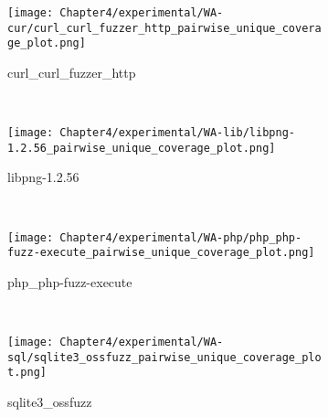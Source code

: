 \begin{figure}[!t]
    \begin{adjustbox}{center,max width=1.3\textwidth}
        \begin{subfigure}[t]{0.55\textwidth}
            \centering
            \texttt{[image: Chapter4/experimental/WA-cur/curl\_curl\_fuzzer\_http\_pairwise\_unique\_coverage\_plot.png]}
            \vspace*{-5mm}
            \label{wa:curl:p}
            \caption{curl\_curl\_fuzzer\_http}
            \vspace*{5mm}
        \end{subfigure}
        ~
        \begin{subfigure}[t]{0.55\textwidth}
            \centering
            \texttt{[image: Chapter4/experimental/WA-lib/libpng-1.2.56\_pairwise\_unique\_coverage\_plot.png]}
            \vspace*{-5mm}
            \label{wa:libpng:p}
            \caption{libpng-1.2.56}
            \vspace*{5mm}
        \end{subfigure}
    \end{adjustbox}
    ~
    \begin{adjustbox}{center,max width=1.3\textwidth}
        \begin{subfigure}[t]{0.55\textwidth}
            \centering
            \texttt{[image: Chapter4/experimental/WA-php/php\_php-fuzz-execute\_pairwise\_unique\_coverage\_plot.png]}
            \vspace*{-5mm}
            \label{wa:php:p}
            \caption{php\_php-fuzz-execute}
            \vspace*{5mm}
        \end{subfigure}
        ~
        \begin{subfigure}[t]{0.55\textwidth}
            \centering
            \texttt{[image: Chapter4/experimental/WA-sql/sqlite3\_ossfuzz\_pairwise\_unique\_coverage\_plot.png]}
            \vspace*{-5mm}
            \label{wa:sql:p}
            \caption{sqlite3\_ossfuzz}
            \vspace*{5mm}
        \end{subfigure}
    \end{adjustbox}
    ~
    \begin{adjustbox}{center,max width=1.3\textwidth}
        \begin{subfigure}[t]{0.55\textwidth}

\end{subfigure}
\end{adjustbox}
\end{figure}
